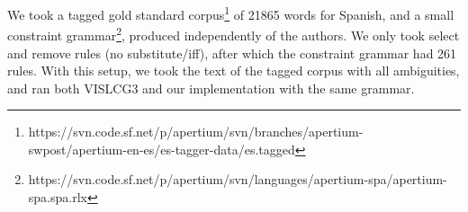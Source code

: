 \documentclass[11pt]{article}
\newcommand{\todo}[1]{{\color{cyan}\textbf{[TODO: }#1\textbf{]}}}
\begin{document}
We took a tagged gold standard corpus\footnote{https://svn.code.sf.net/p/apertium/svn/branches/apertium-swpost/apertium-en-es/es-tagger-data/es.tagged} of 21865 words for Spanish, 
and a small constraint grammar\footnote{https://svn.code.sf.net/p/apertium/svn/languages/apertium-spa/apertium-spa.spa.rlx}, produced independently of the authors.
We only took select and remove rules (no substitute/iff), after which the constraint grammar had 261 rules.
With this setup, we took the text of the tagged corpus with all ambiguities, and ran both VISLCG3 and our implementation with the same grammar. 


\end{document}
